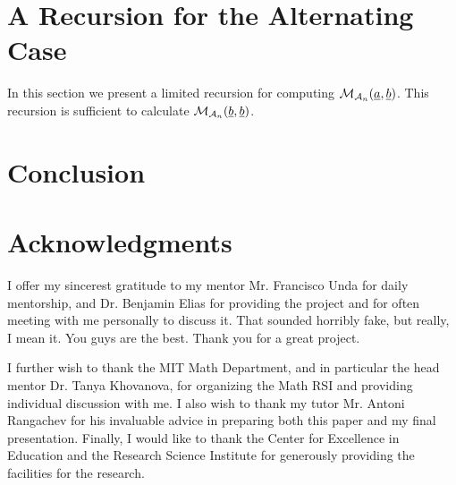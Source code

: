 \section{A Recursion for the Alternating Case}
In this section we present a limited recursion for computing $\mathcal M_{\mathcal A_n}(\underline{a}, \underline{b})$.  This recursion is sufficient to calculate $\mathcal M_{\mathcal A_n}(\underline{b}, \underline{b})$.


\section{Conclusion}

\section{Acknowledgments} 
I offer my sincerest gratitude to my mentor Mr. Francisco Unda for daily mentorship, and Dr. Benjamin Elias for providing the project and for often meeting with me personally to discuss it.
That sounded horribly fake, but really, I mean it.  You guys are the best.  Thank you for a great project.

I further wish to thank the MIT Math Department, and in particular the head mentor Dr. Tanya Khovanova, for organizing the Math RSI and providing individual discussion with me.
I also wish to thank my tutor Mr. Antoni Rangachev for his invaluable advice in preparing both this paper and my final presentation.
Finally, I would like to thank the Center for Excellence in Education and the Research Science Institute for generously providing the facilities for the research.


